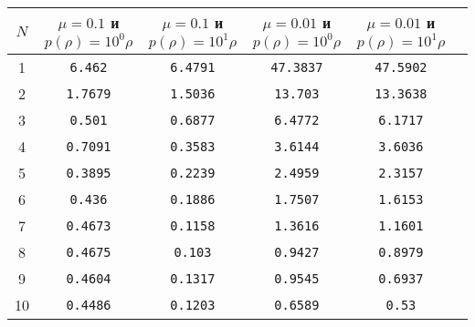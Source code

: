 \begin{table}[H]
\centering
\begin{tabular}{|c|c|c|c|c|c|}
\hline
$N$ & $\mu = 0.1$ и $ p(\rho) = 10^0\rho$ & $\mu = 0.1$ и $ p(\rho) = 10^1\rho$ & $\mu = 0.01$ и $ p(\rho) = 10^0\rho$ & $\mu = 0.01$ и $ p(\rho) = 10^1\rho$ \\
\hline
1 & \texttt{6.462} & \texttt{6.4791} & \texttt{47.3837} & \texttt{47.5902} \\
\hline
2 & \texttt{1.7679} & \texttt{1.5036} & \texttt{13.703} & \texttt{13.3638} \\
\hline
3 & \texttt{0.501} & \texttt{0.6877} & \texttt{6.4772} & \texttt{6.1717} \\
\hline
4 & \texttt{0.7091} & \texttt{0.3583} & \texttt{3.6144} & \texttt{3.6036} \\
\hline
5 & \texttt{0.3895} & \texttt{0.2239} & \texttt{2.4959} & \texttt{2.3157} \\
\hline
6 & \texttt{0.436} & \texttt{0.1886} & \texttt{1.7507} & \texttt{1.6153} \\
\hline
7 & \texttt{0.4673} & \texttt{0.1158} & \texttt{1.3616} & \texttt{1.1601} \\
\hline
8 & \texttt{0.4675} & \texttt{0.103} & \texttt{0.9427} & \texttt{0.8979} \\
\hline
9 & \texttt{0.4604} & \texttt{0.1317} & \texttt{0.9545} & \texttt{0.6937} \\
\hline
10 & \texttt{0.4486} & \texttt{0.1203} & \texttt{0.6589} & \texttt{0.53} \\
\hline
\end{tabular}
\end{table}


